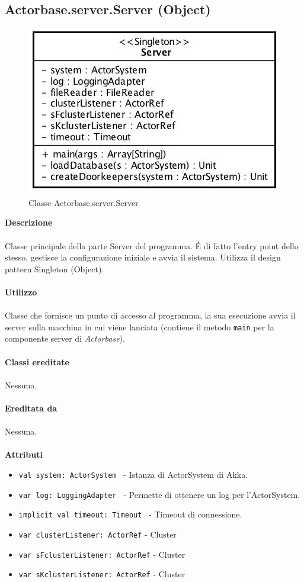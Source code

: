 \documentclass[a4paper]{article}
\begin{document}
	\subsection{Actorbase.server.Server (Object)}
		\begin{figure}[H]
			\centering
			\includegraphics[scale=0.5]{Server/serverClass.jpg}
			\caption{Classe Actorbase.server.Server}
		\end{figure}
		\textbf{Descrizione}
			\\ \\
			Classe principale della parte Server del programma. \'E di fatto l'entry point dello stesso, gestisce la configurazione iniziale e avvia il sistema. Utilizza il design pattern Singleton (Object).
			\\ \\
		\textbf{Utilizzo}
			\\ \\
			Classe che fornisce un punto di accesso al programma, la sua esecuzione avvia il server sulla macchina in cui viene lanciata (contiene il metodo \texttt{main} per la componente server di \emph{Actorbase}).
			\\ \\
		\textbf{Classi ereditate}
			\\ \\
			Nessuna.
			\\ \\
		\textbf{Ereditata da}
			\\ \\
			Nessuna.
			\\ \\
		\textbf{Attributi}
			\begin{itemize}
				\item \texttt{val system: ActorSystem } - Istanza di ActorSystem di Akka.
				\item \texttt{var log: LoggingAdapter } - Permette di ottenere un log per l'ActorSystem.
				\item \texttt{implicit val timeout: Timeout } - Timeout di connessione.
				\item \texttt{var clusterListener: ActorRef} - Cluster
				\item \texttt{var sFclusterListener: ActorRef} - Cluster
				\item \texttt{var sKclusterListener: ActorRef} - Cluster
			\end{itemize}
\end{document}

